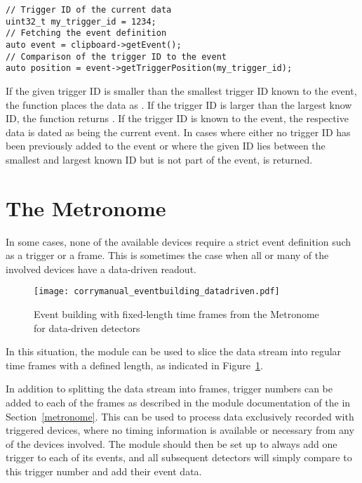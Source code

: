 \begin{verbatim}
// Trigger ID of the current data
uint32_t my_trigger_id = 1234;
// Fetching the event definition
auto event = clipboard->getEvent();
// Comparison of the trigger ID to the event
auto position = event->getTriggerPosition(my_trigger_id);
\end{verbatim}

If the given trigger ID is smaller than the smallest trigger ID known to the event, the function places the data as .
If the trigger ID is larger than the largest know ID, the function returns . If the trigger ID is known to the event, the respective data is dated as being  the current event.
In cases where either no trigger ID has been previously added to the event or where the given ID lies between the smallest and largest known ID but is not part of the event,  is returned.

\section{The Metronome}
\label{sec:metronome}

In some cases, none of the available devices require a strict event definition such as a trigger or a frame.
This is sometimes the case when all or many of the involved devices have a data-driven readout.

\begin{figure}[tbp]
        \centering
        \texttt{[image: corrymanual\_eventbuilding\_datadriven.pdf]}
        \caption{Event building with fixed-length time frames from the Metronome for data-driven detectors}
        \label{fig:datadriven}
\end{figure}

In this situation, the  module can be used to slice the data stream into regular time frames with a defined length, as indicated in Figure~\ref{fig:datadriven}.

In addition to splitting the data stream into frames, trigger numbers can be added to each of the frames as described in the module documentation of the  in Section~\ref{metronome}.
This can be used to process data exclusively recorded with triggered devices, where no timing information is available or necessary from any of the devices involved.
The module should then be set up to always add one trigger to each of its events, and all subsequent detectors will simply compare to this trigger number and add their event data.

